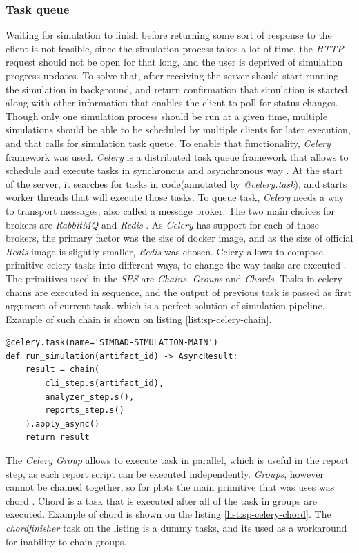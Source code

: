\subsubsection{Task queue}
Waiting for simulation to finish before returning some sort of response to the client is not feasible, since the simulation process takes a lot of time, the \textit{HTTP} request should not be open for that long, and the user is deprived of simulation progress updates. To solve that, after receiving the server should start running the simulation in background, and return confirmation that simulation is started, along with other information that enables the client to poll for status changes.
Though only one simulation process should be run at a given time, multiple simulations should be able to be scheduled by multiple clients for later execution, and that calls for simulation task queue. To enable that functionality, \textit{Celery} framework was used. \textit{Celery} is a distributed task queue framework that allows to schedule and execute tasks in synchronous and asynchronous way \cite{CeleryDocs}. At the start of the server, it searches for tasks in code(annotated by \textit{@celery.task}), and starts worker threads that will execute those tasks.
To queue task, \textit{Celery} needs a way to transport messages, also called a message broker. The two main choices for brokers are \textit{RabbitMQ} and \textit{Redis} \cite{CeleryBrokers}. As \textit{Celery} has support for each of those brokers, the primary factor was the size of docker image, and as the size of official \textit{Redis} image is slightly smaller, \textit{Redis} was chosen.
Celery allows to compose primitive celery tasks into different ways, to change the way tasks are executed \cite{CeleryCanvas}. The primitives used in the \textit{SPS} are \textit{Chains}, \textit{Groups} and \textit{Chords}. Tasks in celery chains are executed in sequence, and the output of previous task is passed as first argument of current task, which is a perfect solution of simulation pipeline. Example of such chain is shown on listing \ref{list:sp-celery-chain}. 
\begin{lstlisting}[label=list:sp-celery-chain,caption=\textit{Celery} chain - main simulation task, basicstyle=\footnotesize\ttfamily]
@celery.task(name='SIMBAD-SIMULATION-MAIN')
def run_simulation(artifact_id) -> AsyncResult:
    result = chain(
        cli_step.s(artifact_id),
        analyzer_step.s(),
        reports_step.s()
    ).apply_async()
    return result
\end{lstlisting}
The \textit{Celery Group} allows to execute task in parallel, which is useful in the report step, as each report script can be executed independently. \textit{Groups}, however cannot be chained together, so for plots the main primitive that was uses was chord \cite{CeleryCanvas}. Chord is a task that is executed after all of the task in groups are executed. Example of chord is shown on the listing \ref{list:sp-celery-chord}. The \textit{chordfinisher} task on the listing is a dummy tasks, and its used as a workaround for inability to chain groups.
